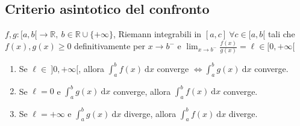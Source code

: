 \subsection{Criterio asintotico del confronto}
\begin{theorem}
	\label{th:criterio asintotico confronto integrale}
	$f,g: [a,b[\rightarrow \mathbb{R}, \ b \in \mathbb{R} \cup \{+\infty\}$, Riemann integrabili in $[a,c] \ \forall c \in [a,b[$ tali che $f(x),g(x)\geq 0$ definitivamente per $x \rightarrow b^-$ e $\lim_{x \rightarrow b^-} \frac{f(x)}{g(x)}= \ell \in [0,+\infty[$
	\begin{enumerate}
		\item Se $\ell \in \ ]0,+\infty[$, allora $ \int_{a}^{b} f(x) \ \mathrm{d}x$ converge $\iff \int_{a}^{b} g(x) \ \mathrm{d}x$ converge.
		
		\item Se $\ell=0$ e $\int_{a}^{b} g(x) \ \mathrm{d}x $ converge, allora $\int_{a}^{b} f(x) \ \mathrm{d}x$ converge.
		
		\item Se $\ell=+\infty$ e $\int_{a}^{b} g(x) \ \mathrm{d}x$ diverge, allora $\int_{a}^{b} f(x) \ \mathrm{d}x$ diverge.
	\end{enumerate}
\end{theorem}


